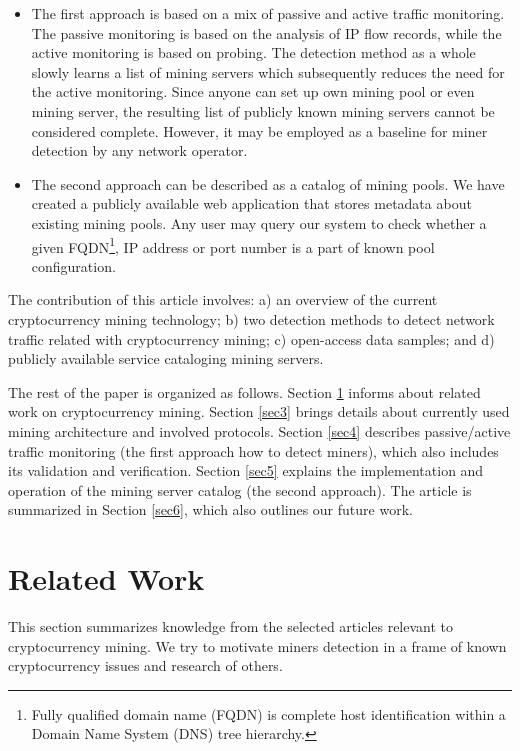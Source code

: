 \documentclass[preprint,12pt,3p]{elsarticle}
\begin{document}
\begin{itemize}
    \item The first approach is based on a mix of passive and active traffic monitoring. The passive monitoring is based on the analysis of IP flow records, while the active monitoring is based on probing. The detection method as a whole slowly learns a list of mining servers which subsequently reduces the need for the active monitoring. Since anyone can set up own mining pool or even mining server, the resulting list of publicly known mining servers cannot be considered complete. However, it may be employed as a baseline for miner detection by any network operator. 
    \item The second approach can be described as a catalog of mining pools. We have created a publicly available web application that stores metadata about existing mining pools. Any user may query our system to check whether a given FQDN\footnote{Fully qualified domain name (FQDN) is complete host identification within a Domain Name System (DNS) tree hierarchy.}, IP address or port number is a part of known pool configuration.
\end{itemize}  

The contribution of this article involves: a) an overview of the current cryptocurrency mining technology; b) two detection methods to detect network traffic related with cryptocurrency mining; c) open-access data samples; and d) publicly available service cataloging mining servers.

The rest of the paper is organized as follows. Section \ref{sec2} informs about related work on cryptocurrency mining. Section \ref{sec3} brings details about currently used mining architecture and involved protocols. Section \ref{sec4} describes passive/active traffic monitoring (the first approach how to detect miners), which also includes its validation and verification. Section \ref{sec5} explains the implementation and operation of the mining server catalog (the second approach). The article is summarized in Section \ref{sec6}, which also outlines our future work. 


\section{Related Work}
\label{sec2}
This section summarizes knowledge from the selected articles relevant to cryptocurrency mining. We try to motivate miners detection in a frame of known cryptocurrency issues and research of others. 
\end{document}

